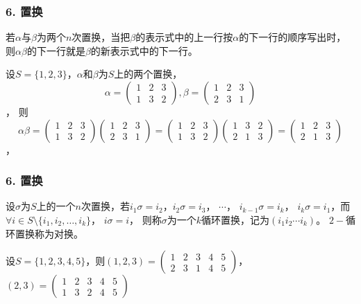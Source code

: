 \documentclass{beamer}
\begin{document}
\begin{CJK*}{UTF8}{gbsn}
 \begin{frame}
  \frametitle{6. 置换} 
  若$\alpha$与$\beta$为两个$n$次置换，当把$\beta$的表示式中的上一行按$\alpha$的下一行的顺序写出时，则$\alpha \beta$的下一行就是$\beta$的新表示式中的下一行。
  \begin{Ex}
    设$S=\{1,2,3\}$，$\alpha$和$\beta$为$S$上的两个置换，
    \[\alpha=\begin{pmatrix}1&2&3\\1&3&2\end{pmatrix},\beta=\begin{pmatrix}1&2&3\\2&3&1\end{pmatrix}\]，
    则
    \[\alpha\beta=\begin{pmatrix}1&2&3\\1&3&2\end{pmatrix}\begin{pmatrix}1&2&3\\2&3&1\end{pmatrix}=\begin{pmatrix}1&2&3\\1&3&2\end{pmatrix}\begin{pmatrix}1&3&2\\2&1&3\end{pmatrix}=\begin{pmatrix}1&2&3\\2&1&3\end{pmatrix}\]，    
  \end{Ex}   
 \end{frame}
 \begin{frame}
   \frametitle{6. 置换}
   \begin{Def}\justifying\let\raggedright\justifying
     设$\sigma$为$S$上的一个$n$次置换，若$i_1\sigma=i_2$，$i_2\sigma = i_3$， $\cdots$， $i_{k-1}\sigma = i_k$， $i_k\sigma = i_1$，而$\forall i \in S\setminus \{i_1, i_2, \ldots, i_k\}$， $i\sigma = i$，
     则称$\sigma$为一个\alert{$k$循环置换}，记为$(i_1i_2\cdots i_k)$。 $2-$循环置换称为\alert{对换}。
   \end{Def}
   \begin{Ex}
   设$S=\{1,2,3,4,5\}$，则$(1,2,3)=\begin{pmatrix}1&2&3&4&5\\2&3&1&4&5\end{pmatrix}$，$(2,3)=\begin{pmatrix}1&2&3&4&5\\1&3&2&4&5\end{pmatrix}$     
   \end{Ex}
 \end{frame}


\end{CJK*}
\end{document}
